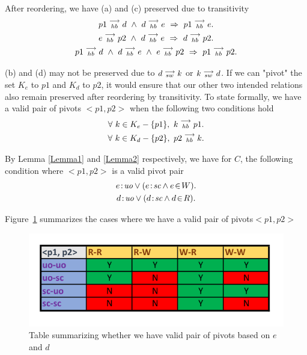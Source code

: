     After reordering, we have (a) and (c) preserved due to transitivity  
    \begin{gather*}
        \reln{p1}{hb}{d} \ \wedge \ \reln{d}{hb}{e} \ \Rightarrow \ \reln{p1}{hb}{e}. \\
        \reln{e}{hb}{p2} \ \wedge \ \reln{d}{hb}{e} \ \Rightarrow \ \reln{d}{hb}{p2}. \\
        \reln{p1}{hb}{d} \ \wedge \ \reln{d}{hb}{e} \ \wedge \ \reln{e}{hb}{p2} \ \Rightarrow \ \reln{p1}{hb}{p2}. 
    \end{gather*}

    (b) and (d) may not be preserved due to $d\stackrel{\longrightarrow}{_{sw}}k$ or $k\stackrel{\longrightarrow}{_{sw}}d$. If we can "pivot" the  set $K_e$ to $p1$ and $K_d$ to $p2$, it would ensure that our other two intended relations also remain preserved after reordering by transitivity. To state formally, we have a valid pair of pivots $<p1,p2>$ when the following two conditions hold
    \begin{gather*}
        \forall \ k \in K_e - \{p1\}, \ k\stackrel{\longrightarrow}{_{hb}}p1. \\
        \forall \ k \in K_d - \{p2\}, \ p2\stackrel{\longrightarrow}{_{hb}}k.
    \end{gather*}
    
    
    By Lemma \ref{Lemma1} and \ref{Lemma2} respectively, we have for $C$, the following condition where $<p1, p2>$ is a valid pivot pair
    \begin{gather*}
        \et{e}{uo} \vee (\et{e}{sc} \wedge \event{e}{W}). \\
        \et{d}{uo} \vee (\et{d}{sc} \wedge \event{d}{R}).
    \end{gather*}
        
    Figure~\ref{reord:preserve_hb_table} summarizes the cases where we have a valid pair of pivots\footnotemark $<p1,p2>$
    \begin{figure}[H]
        \centering
        \includegraphics[scale=0.7]{5.InstructionReordering/4.ValidReorderingCandidate/ProofParts/Part1/part1_table.pdf}
        \caption{Table summarizing whether we have valid pair of pivots based on  $e$ and $d$}
        \label{reord:preserve_hb_table}
    \end{figure}
            
